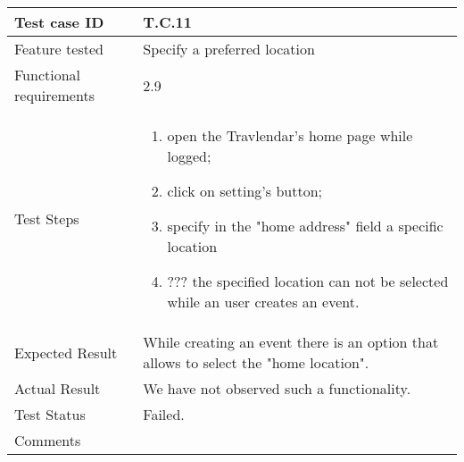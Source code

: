 \begin{table}[H]
	\begin{center}
		\begin{tabular}{ | p{} | p{} | }
		\hline
		Test case ID & T.C.11\\
		\hline
		Feature tested & Specify a preferred location\\
		\hline
		Functional requirements & 2.9\\
		\hline
		Test Steps & 
			\begin{enumerate}
				\item open the Travlendar's home page while logged;
				\item click on setting's button;
				\item specify in the "home address" field a specific location
				\item ??? the specified location can not be selected while an user creates an event.
			\end{enumerate} \\
		\hline
		Expected Result & While creating an event there is an option that allows to select the "home location".\\
		\hline
		Actual Result & We have not observed such a functionality.\\ 
		\hline
		Test Status & \color{Red}Failed.\\ 
		\hline
		Comments &\\ 
		\hline
		\end{tabular}
	\end{center}
\end{table}

